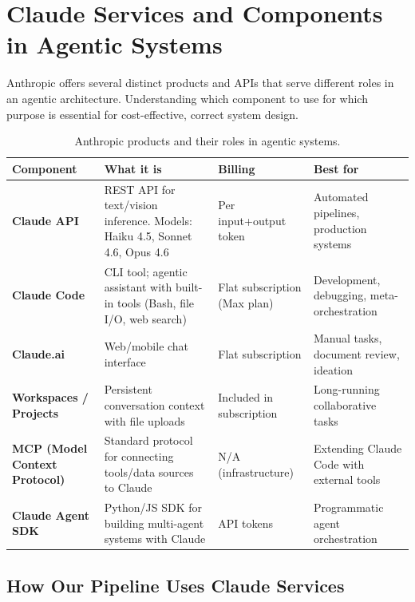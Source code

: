 \documentclass[12pt,a4paper]{article}
\begin{document}
\section{Claude Services and Components in Agentic Systems}
\label{sec:claude_services}

Anthropic offers several distinct products and APIs that serve different roles
in an agentic architecture. Understanding which component to use for which
purpose is essential for cost-effective, correct system design.

\begin{table}[h]
\centering\small
\begin{tabular}{@{}p{3cm}p{3.5cm}p{3cm}p{3.5cm}@{}}
\toprule
\textbf{Component} & \textbf{What it is} & \textbf{Billing} & \textbf{Best for} \\
\midrule
\textbf{Claude API} &
  REST API for text/vision inference. Models: Haiku 4.5, Sonnet 4.6, Opus 4.6 &
  Per input+output token &
  Automated pipelines, production systems \\
\addlinespace
\textbf{Claude Code} &
  CLI tool; agentic assistant with built-in tools (Bash, file I/O, web search) &
  Flat subscription (Max plan) &
  Development, debugging, meta-orchestration \\
\addlinespace
\textbf{Claude.ai} &
  Web/mobile chat interface &
  Flat subscription &
  Manual tasks, document review, ideation \\
\addlinespace
\textbf{Workspaces / Projects} &
  Persistent conversation context with file uploads &
  Included in subscription &
  Long-running collaborative tasks \\
\addlinespace
\textbf{MCP (Model Context Protocol)} &
  Standard protocol for connecting tools/data sources to Claude &
  N/A (infrastructure) &
  Extending Claude Code with external tools \\
\addlinespace
\textbf{Claude Agent SDK} &
  Python/JS SDK for building multi-agent systems with Claude &
  API tokens &
  Programmatic agent orchestration \\
\bottomrule
\end{tabular}
\caption{Anthropic products and their roles in agentic systems.}
\end{table}

\subsection{How Our Pipeline Uses Claude Services}
\end{document}
